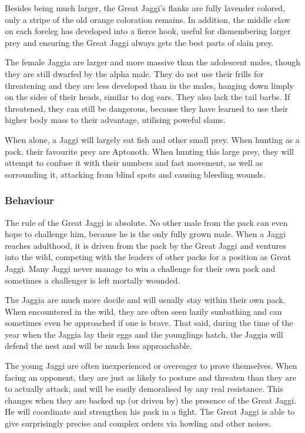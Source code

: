 Besides being much larger, the Great Jaggi's flanks are fully lavender colored, only a stripe of the old orange coloration remains. In addition, the middle claw on each foreleg has developed into a fierce hook, useful for dismembering larger prey and ensuring the Great Jaggi always gets the best parts of slain prey.

The female Jaggia are larger and more massive than the adolescent males, though they are still dwarfed by the alpha male. They do not use their frills for threatening and they are less developed than in the males, hanging down limply on the sides of their heads, similar to dog ears. They also lack the tail barbs. If threatened, they can still be dangerous, because they have learned to use their higher body mass to their advantage, utilising poweful slams.

When alone, a Jaggi will largely eat fish and other small prey. When hunting as a pack, their favourite prey are Aptonoth. When hunting this large prey, they will attempt to confuse it with their numbers and fast movement, as well as sorrounding it, attacking from blind spots and causing bleeding wounds.

\subsubsection{Behaviour}
The rule of the Great Jaggi is absolute. No other male from the pack can even hope to challenge him, because he is the only fully grown male. When a Jaggi reaches adulthood, it is driven from the pack by the Great Jaggi and ventures into the wild, competing with the leaders of other packs for a position as Great Jaggi. Many Jaggi never manage to win a challenge for their own pack and sometimes a challenger is left mortally wounded.

The Jaggia are much more docile and will usually stay within their own pack. When encountered in the wild, they are often seen lazily sunbathing and can sometimes even be approached if one is brave. That said, during the time of the year when the Jaggia lay their eggs and the younglings hatch, the Jaggia will defend the nest and will be much less approachable.

The young Jaggi are often inexperienced or overeager to prove themselves. When facing an opponent, they are just as likely to posture and threaten than they are to actually attack, and will be easily demoralised by any real resistance. This changes when they are backed up (or driven by) the presence of the Great Jaggi. He will coordinate and strengthen his pack in a fight. The Great Jaggi is able to give surprisingly precise and complex orders via howling and other noises.

